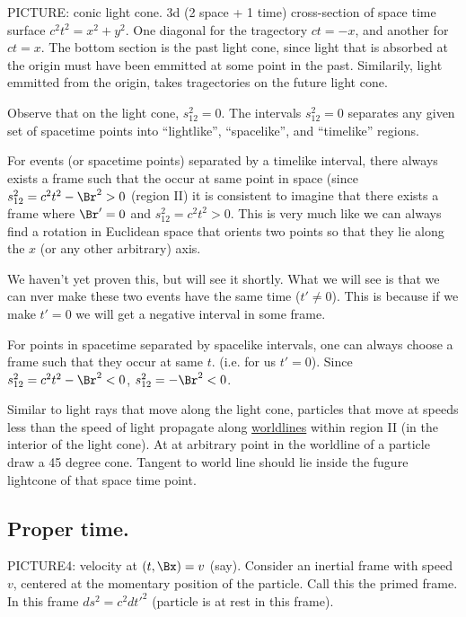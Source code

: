 PICTURE: conic light cone.  3d (2 space + 1 time) cross-section of space time surface $c^2 t^2 = x^2 + y^2$.  One diagonal for the tragectory $ct = -x$, and another for $ct = x$.  The bottom section is the past light cone, since light that is absorbed at the origin must have been emmitted at some point in the past.  Similarily, light emmitted from the origin, takes tragectories on the future light cone.

Observe that on the light cone, $s_{12}^2 = 0$.  The intervals $s_{12}^2 = 0$ separates any given set of spacetime points into ``lightlike'', ``spacelike'', and ``timelike'' regions.

For events (or spacetime points) separated by a timelike interval, there always exists a frame such that the occur at same point in space (since $s_{12}^2 = c^2 t^2 - \Br^2 > 0$ (region II) it is consistent to imagine that there exists a frame where $\Br' = 0$ and $s_{12}^2 = c^2 t^2 > 0$.  This is very much like we can always find a rotation in Euclidean space that orients two points so that they lie along the $x$ (or any other arbitrary) axis.

We haven't yet proven this, but will see it shortly.  What we will see is that we can nver make these two events have the same time ($t' \ne 0$).  This is because if we make $t' = 0$ we will get a negative interval in some frame.

For points in spacetime separated by spacelike intervals, one can always choose a frame such that they occur at same $t$.  (i.e. for us $t' = 0$).  Since $s_{12}^2 = c^2 t^2 - \Br^2 < 0$, $s_{12}^2 = -\Br^2 < 0$.

Similar to light rays that move along the light cone, particles that move at speeds less than the speed of light propagate along \underline{worldlines} within region II (in the interior of the light cone).  At at arbitrary point in the worldline of a particle draw a 45 degree cone.  Tangent to world line should lie inside the fugure lightcone of that space time point.

\subsection{Proper time.}

PICTURE4: velocity at $(t, \Bx) = v$ (say).  Consider an inertial frame with speed $v$, centered at the momentary position of the particle.  Call this the primed frame.  In this frame $ds^2 = c^2 {dt'}^2$ (particle is at rest in this frame).

